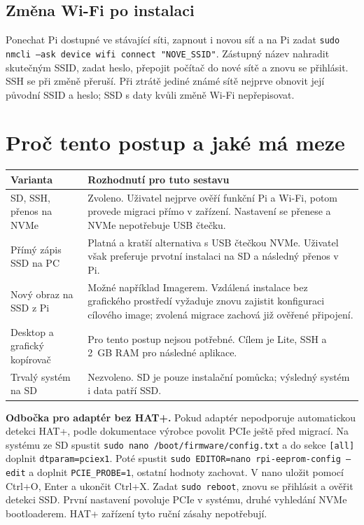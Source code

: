 \documentclass[11pt,a4paper]{article}
\newcounter{postup}
\begin{document}
\subsection{Změna Wi-Fi po instalaci}
Ponechat Pi dostupné ve stávající síti, zapnout i novou síť a na Pi zadat \texttt{sudo nmcli --ask device wifi connect "NOVE\_SSID"}. Zástupný název nahradit skutečným SSID, zadat heslo, přepojit počítač do nové sítě a znovu se přihlásit. SSH se při změně přeruší. Při ztrátě jediné známé sítě nejprve obnovit její původní SSID a heslo; SSD s daty kvůli změně Wi-Fi nepřepisovat.\cite{configuration}

\clearpage
\section{Proč tento postup a jaké má meze}
\begin{tabularx}{\textwidth}{L{42mm}Y}
\toprule Varianta & Rozhodnutí pro tuto sestavu\\\midrule
SD, SSH, přenos na NVMe & Zvoleno. Uživatel nejprve ověří funkční Pi a Wi-Fi, potom provede migraci přímo v zařízení. Nastavení se přenese a NVMe nepotřebuje USB čtečku.\\\addlinespace
Přímý zápis SSD na PC & Platná a kratší alternativa s USB čtečkou NVMe. Uživatel však preferuje prvotní instalaci na SD a následný přenos v Pi.\\\addlinespace
Nový obraz na SSD z Pi & Možné například Imagerem. Vzdálená instalace bez grafického prostředí vyžaduje znovu zajistit konfiguraci cílového image; zvolená migrace zachová již ověřené připojení.\\\addlinespace
Desktop a grafický kopírovač & Pro tento postup nejsou potřebné. Cílem je Lite, SSH a 2~GB RAM pro následné aplikace.\\\addlinespace
Trvalý systém na SD & Nezvoleno. SD je pouze instalační pomůcka; výsledný systém i data patří SSD.\\
\bottomrule
\end{tabularx}

\textbf{Odbočka pro adaptér bez HAT+.} Pokud adaptér nepodporuje automatickou detekci HAT+, podle dokumentace výrobce povolit PCIe ještě před migrací. Na systému ze SD spustit \texttt{sudo nano /boot/firmware/config.txt} a do sekce \texttt{[all]} doplnit \texttt{dtparam=pciex1}. Poté spustit \texttt{sudo EDITOR=nano rpi-eeprom-config --edit} a doplnit \texttt{PCIE\_PROBE=1}, ostatní hodnoty zachovat. V nano uložit pomocí Ctrl+O, Enter a ukončit Ctrl+X. Zadat \texttt{sudo reboot}, znovu se přihlásit a ověřit detekci SSD. První nastavení povoluje PCIe v systému, druhé vyhledání NVMe bootloaderem. HAT+ zařízení tyto ruční zásahy nepotřebují.\cite{nvme}
\end{document}

